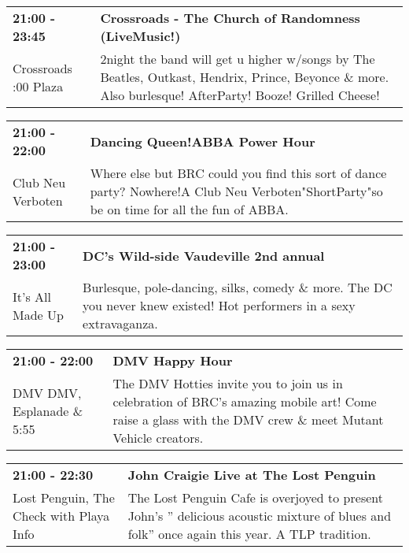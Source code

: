 \begin{tabular}{ p{1in} p{2.2in} }
    \textbf{21:00 - 23:45} & \textbf{Crossroads - The Church of Randomness (LiveMusic!)} \\
    Crossroads \newline 9:00 Plaza & 2night the band will get u higher w/songs by The Beatles, Outkast, Hendrix, Prince, Beyonce \& more. Also burlesque! AfterParty! Booze! Grilled Cheese! \\
    \hline 
\end{tabular}
    
\begin{tabular}{ p{1in} p{2.2in} }
    \textbf{21:00 - 22:00} & \textbf{Dancing Queen!ABBA Power Hour} \\
    Club Neu Verboten \newline  & Where else but BRC could you find this sort of dance party? Nowhere!A Club Neu Verboten"ShortParty"so be on time for all the fun of ABBA. \\
    \hline 
\end{tabular}
    
\begin{tabular}{ p{1in} p{2.2in} }
    \textbf{21:00 - 23:00} & \textbf{DC's Wild-side Vaudeville 2nd annual } \\
    It's All Made Up \newline  & Burlesque, pole-dancing, silks, comedy \& more. The DC you never knew existed! Hot performers in a sexy extravaganza. \\
    \hline 
\end{tabular}
    
\begin{tabular}{ p{1in} p{2.2in} }
    \textbf{21:00 - 22:00} & \textbf{DMV Happy Hour} \\
    DMV \newline DMV, Esplanade \& 5:55 & The DMV Hotties invite you to join us in celebration of BRC's amazing mobile art! Come raise a glass with the DMV crew \& meet Mutant Vehicle creators. \\
    \hline 
\end{tabular}
    
\begin{tabular}{ p{1in} p{2.2in} }
    \textbf{21:00 - 22:30} & \textbf{John Craigie Live at The Lost Penguin} \\
    Lost Penguin, The \newline Check with Playa Info & The Lost Penguin Cafe is overjoyed to present John's '' delicious acoustic mixture of blues and folk'' once again this year.  A TLP tradition. \\
    \hline 
\end{tabular}
    
